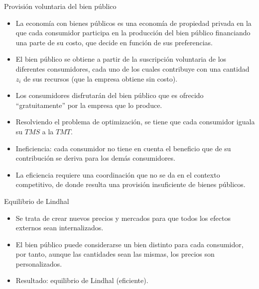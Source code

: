 \begin{frame}{Provisión voluntaria del bien público}
	\begin{itemize}
		\item La economía con bienes públicos es una economía de propiedad privada en la que cada consumidor participa en la producción del bien público financiando una parte de su costo, que decide en función de sus preferencias.
		\item El bien público se obtiene a partir de la suscripción voluntaria de los diferentes consumidores, cada uno de los cuales contribuye con una cantidad $z_i$ de sus recursos (que la empresa obtiene sin costo).
		\item Los consumidores disfrutarán del bien público que es ofrecido ``gratuitamente'' por la empresa que lo produce.
		\item Resolviendo el problema de optimización, se tiene que cada consumidor iguala su $TMS$ a la $TMT$.
		\item Ineficiencia: cada consumidor no tiene en cuenta el beneficio que de su contribución se deriva para los demás consumidores.
		\item La eficiencia requiere una coordinación que no se da en el contexto competitivo, de donde resulta una provisión insuficiente de bienes públicos.
	\end{itemize}
\end{frame}
\begin{frame}{Equilibrio de Lindhal}
	\begin{itemize}
		\item Se trata de crear nuevos precios y mercados para que todos los efectos externos sean internalizados.
		\item El bien público puede considerarse un bien distinto para cada consumidor, por tanto, aunque las cantidades sean las mismas, los precios son personalizados.
		\item Resultado: equilibrio de Lindhal (eficiente).
	\end{itemize}
\end{frame}